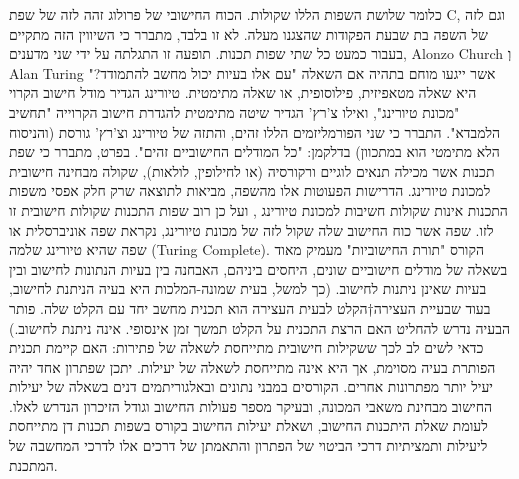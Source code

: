       כלומר שלושת השפות הללו שקולות. הכוח החישובי של פרולוג זהה לזה של שפת C,
      וגם לזה של השפה בת שבעת הפקודות שהצגנו מעלה. לא זו בלבד, מתברר כי השיווין
      הזה מתקיים בעבור כמעט כל שתי שפות תכנות.  תופעה זו התגלתה על ידי שני
      מדענים, Alonzo Church וְ Alan Turing אשר ייגעו מוחם בתהיה אם השאלה "עם אלו
      בעיות יכול מחשב להתמודד?" היא שאלה מטאפיזית, פילוסופית, או שאלה מתימטית.
      טיורינג הגדיר מודל חישוב הקרוי "מכונת טיורינג", ואילו צ'רץ' הגדיר שיטה מתימטית להגדרת חישוב הקרוייה "תחשיב הלמבדא". התברר כי שני הפורמליזמים הללו זהים, והתזה של טיורינג וצ'רץ' גורסת (והניסוח הלא מתימטי הוא במתכוון) בדלקמן: "כל המודלים החישוביים זהים".
      בפרט, מתברר כי שפת תכנות אשר מכילה תנאים לוגיים ורקורסיה (או לחילופין, לולאות), שקולה מבחינה חישובית למכונת טיורינג. הדרישות הפעוטות אלו מהשפה, מביאות לתוצאה שרק חלק אפסי משפות התכנות אינות שקולות חשיבות למכונת טיורינג , ועל כן רוב שפות התכנות שקולות חישובית זו לזו.
      שפה אשר כוח החישוב שלה שקול לזה של מכונת טיורינג, נקראת שפה אוניברסלית או שפה שהיא טיורינג שלמה (Turing Complete).
      הקורס "תורת החישוביות" מעמיק מאוד בשאלה של מודלים חישוביים שונים, היחסים ביניהם, האבחנה בין בעיות הנתונות לחישוב ובין בעיות שאינן ניתנות לחישוב. (כך למשל, בעית שמונה-המלכות היא בעיה הניתנת לחישוב, בעוד שבעיית העצירה†{הקלט לבעית העצירה הוא תכנית מחשב יחד עם הקלט שלה. פותר הבעיה נדרש להחליט האם הרצת התכנית על הקלט תמשך זמן אינסופי.} אינה ניתנת לחישוב.)
      כדאי לשים לב לכך ששקילות חישובית מתייחסת לשאלה של פתירות: האם קיימת תכנית הפותרת בעיה מסוימת, אך היא אינה מתייחסת לשאלה של יעילות. יתכן שפתרון אחד יהיה יעיל יותר מפתרונות אחרים.
      הקורסים במבני נתונים ובאלגוריתמים דנים בשאלה של יעילות החישוב מבחינת משאבי המכונה, ובעיקר מספר פעולות החישוב וגודל הזיכרון הנדרש לאלו. לעומת שאלת היתכנות החישוב, ושאלת יעילות החישוב בקורס בשפות תכנות דן מתייחסת ליעילות ותמציתיות דרכי הביטוי של הפתרון והתאמתן של דרכים אלו לדרכי המחשבה של המתכנת.


